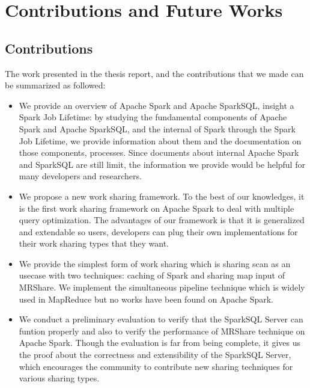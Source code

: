 
\chapter{Contributions and Future Works} %

\label{Chapter6} %



\section{Contributions}
The work presented in the thesis report, and the contributions that we made can be summarized as followed:
\begin{itemize}
\item We provide an overview of Apache Spark and Apache SparkSQL, insight a Spark Job Lifetime: 
by studying the fundamental components of Apache Spark and Apache SparkSQL, and the internal of Spark through the Spark Job Lifetime, we provide information about them and the documentation on those components, processes. Since documents about internal Apache Spark and SparkSQL are still limit, the information we provide would be helpful for many developers and researchers.

\item We propose a new work sharing framework. To the best of our knowledges, it is the first work sharing framework on Apache Spark to deal with multiple query optimization. The advantages of our framework is that it is generalized and extendable so users, developers can plug their own implementations for their  work sharing types that they want. 

\item We provide the simplest form of work sharing which is sharing scan as an usecase with two techniques: caching of Spark and sharing map input of MRShare. We implement the simultaneous pipeline technique which is widely used in MapReduce but no works have been found on Apache Spark.

\item We conduct a preliminary evaluation to verify that the SparkSQL Server can funtion properly and also to verify the performance of MRShare technique on Apache Spark. Though the evaluation is far from being complete, it gives us the proof about the correctness and extensibility of the SparkSQL Server, which encourages the community to contribute new sharing techniques for various sharing types.
\end{itemize}


